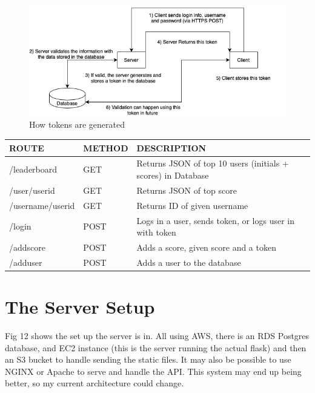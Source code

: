 \documentclass[a4paper, 11pt]{report}
\begin{document}
\begin{figure}[h!]
  \includegraphics[width=0.8\linewidth]{tokens.png}
  \centering
  \caption{How tokens are generated}
  \label{fig:tokens}
\end{figure}

\begin{table}[h!]
\begin{tabular}{|l|l|l|}
\hline
\rowcolor[HTML]{C0C0C0} 
ROUTE            & METHOD & DESCRIPTION                                                  \\ \hline
/leaderboard     & GET    & Returns JSON of top 10 users (initials + scores) in Database \\ \hline
/user/userid     & GET    & Returns JSON of top score                                    \\ \hline
/username/userid & GET    & Returns ID of given username                                 \\ \hline
/login           & POST   & Logs in a user, sends token, or logs user in with token      \\ \hline
/addscore        & POST   & Adds a score, given score and a token                        \\ \hline
/adduser         & POST   & Adds a user to the database                                  \\ \hline
\end{tabular}
\end{table}


\section{The Server Setup}
Fig 12 shows the set up the server is in. All using AWS, there is an RDS Postgres database, and EC2 instance (this is the server running the actual flask) and then an S3 bucket to handle sending the static files. It may also be possible to use NGINX or Apache to serve and handle the API. This system may end up being better, so my current architecture could change. 
\end{document}
